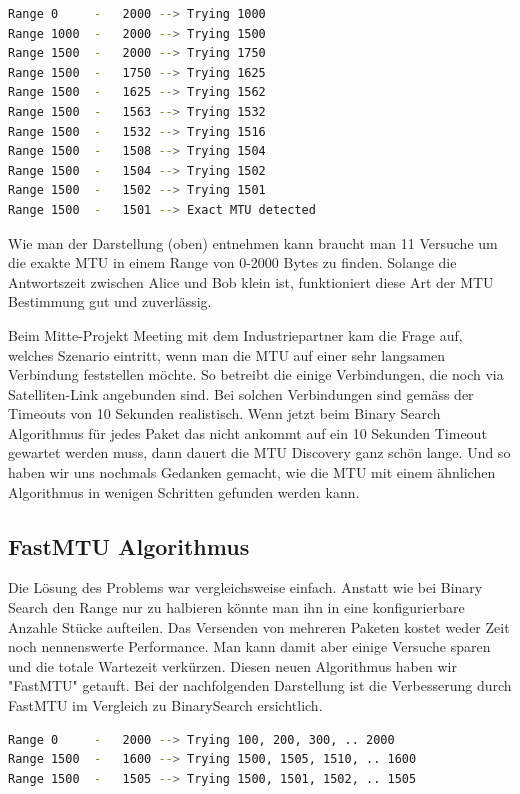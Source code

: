 \begin{lstlisting}[language=bash, caption=MTU Discovery in Binary Search]                    
Range 0		-	2000 --> Trying 1000
Range 1000	-	2000 --> Trying 1500
Range 1500	-	2000 --> Trying 1750
Range 1500	-	1750 --> Trying 1625
Range 1500	-	1625 --> Trying 1562
Range 1500 	-	1563 --> Trying 1532
Range 1500	-	1532 --> Trying 1516
Range 1500	-	1508 --> Trying 1504
Range 1500	- 	1504 --> Trying 1502
Range 1500	-	1502 --> Trying 1501
Range 1500 	- 	1501 --> Exact MTU detected
\end{lstlisting}

Wie man der Darstellung (oben) entnehmen kann braucht man 11 Versuche um die exakte \ac{MTU} in einem Range von 0-2000 Bytes zu finden. Solange die Antwortszeit zwischen Alice und Bob klein ist, funktioniert diese Art der \ac{MTU} Bestimmung gut und zuverlässig.

Beim Mitte-Projekt Meeting mit dem Industriepartner kam die Frage auf, welches Szenario eintritt, wenn man die \ac{MTU} auf einer sehr langsamen Verbindung feststellen möchte. So betreibt die \osag{} einige Verbindungen, die noch via Satelliten-Link angebunden sind. Bei solchen Verbindungen sind gemäss der \osag{} Timeouts von 10 Sekunden realistisch. Wenn jetzt beim Binary Search Algorithmus für jedes Paket das nicht ankommt auf ein 10 Sekunden Timeout gewartet werden muss, dann dauert die \ac{MTU} Discovery ganz schön lange. Und so haben wir uns nochmals Gedanken gemacht, wie die \ac{MTU} mit einem ähnlichen Algorithmus in wenigen Schritten gefunden werden kann.

\subsection{FastMTU Algorithmus}
Die Lösung des Problems war vergleichsweise einfach. Anstatt wie bei Binary Search den Range nur zu halbieren könnte man ihn in eine konfigurierbare Anzahle Stücke aufteilen. Das Versenden von mehreren Paketen kostet weder Zeit noch nennenswerte Performance. Man kann damit aber einige Versuche sparen und die totale Wartezeit verkürzen. Diesen neuen Algorithmus haben wir "FastMTU" getauft. Bei der nachfolgenden Darstellung ist die Verbesserung durch FastMTU im Vergleich zu BinarySearch ersichtlich.

\begin{lstlisting}[language=bash, caption=FastMTU Discovery]                    
Range 0		-	2000 --> Trying 100, 200, 300, .. 2000
Range 1500	-	1600 --> Trying 1500, 1505, 1510, .. 1600
Range 1500	-	1505 --> Trying 1500, 1501, 1502, .. 1505
\end{lstlisting}

